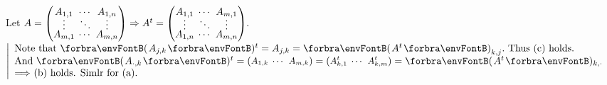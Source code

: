 Let $A={}{\normalsize\begin{pmatrix}A_{1,1} &\hspace{-6pt} \cdots &\hspace{-6pt} A_{1,n}\\[-4pt] \vdots &\hspace{-6pt} \ddots &\hspace{-6pt} \vdots\\[-4pt] A_{m,1} &\hspace{-6pt} \cdots &\hspace{-6pt} A_{m,n}\end{pmatrix}}\Rightarrow A^t={}{\normalsize\begin{pmatrix}A_{1,1} &\hspace{-6pt} \cdots &\hspace{-6pt} A_{m,1}\\[-4pt] \vdots &\hspace{-6pt} \ddots &\hspace{-6pt} \vdots\\[-4pt] A_{1,n} &\hspace{-6pt} \cdots &\hspace{-6pt} A_{m,n}\end{pmatrix}}.$ \;$\MathLeftMid{l}{\!\!$
Note that $\Par{A_{j,k}}{^t}=A_{j,k}=\Par{A^t}_{k,j}.$ Thus (c) holds.$\\$
\!\!And $\Par{A_{\cdot,k}}{^t}={}{\small\begin{pmatrix}A_{1,k} &\hspace{-6pt} \cdots &\hspace{-6pt}A_{m,k}\end{pmatrix}}{}={}{\small\begin{pmatrix}A^t_{k,1} &\hspace{-6pt} \cdots &\hspace{-6pt}A^t_{k,m}\end{pmatrix}}{}=\Par{A^t}{_{k,\cdot}}\\$
\!\!$\Longrightarrow$ (b) holds. Simlr for (a).$}$\par\vspace{8pt}
\SepLine

